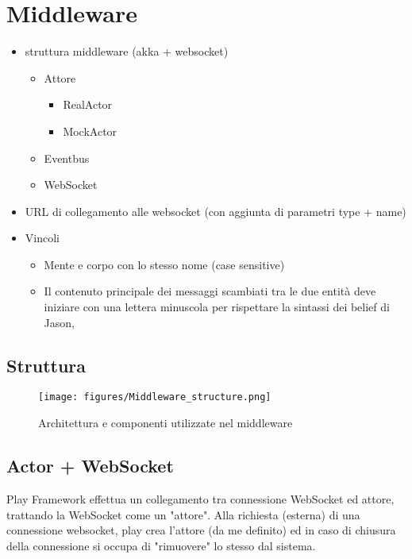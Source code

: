 \section{Middleware}
\begin{itemize}
   \item struttura middleware (akka + websocket)
   \begin{itemize}
      \item Attore
      \begin{itemize}
         \item RealActor
         \item MockActor
      \end{itemize}
      \item Eventbus
      \item WebSocket
   \end{itemize}
   \item URL di collegamento alle websocket (con aggiunta di parametri type + name)
   \item Vincoli
   \begin{itemize}
      \item Mente e corpo con lo stesso nome (case sensitive)
      \item Il contenuto principale dei messaggi scambiati tra le due entità deve iniziare con una lettera minuscola per rispettare la sintassi dei belief di Jason,
   \end{itemize}
\end{itemize}

\subsection{Struttura}

\begin{figure}[H]
\centering
\texttt{[image: figures/Middleware\_structure.png]}
\caption{Architettura e componenti utilizzate nel middleware}
\end{figure}
\subsection{Actor + WebSocket}

Play Framework effettua un collegamento tra connessione WebSocket ed attore, trattando la WebSocket come un "attore". Alla richiesta (esterna) di una connessione websocket, play crea l'attore (da me definito) ed in caso di chiusura della connessione si occupa di "rimuovere" lo stesso dal sistema.

